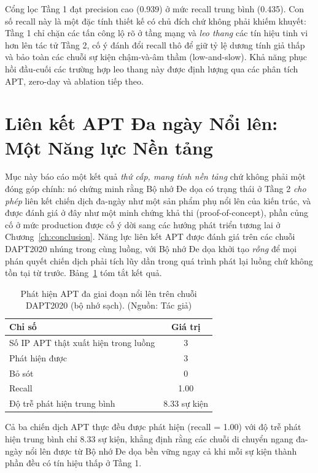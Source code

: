 Cổng lọc Tầng 1 đạt precision cao (0.939) ở mức recall trung bình (0.435). Con số recall này là một đặc tính thiết kế có chủ đích chứ không phải khiếm khuyết: Tầng 1 chỉ chặn các tấn công lộ rõ ở tầng mạng và \emph{leo thang} các tín hiệu tinh vi hơn lên tác tử Tầng 2, cố ý đánh đổi recall thô để giữ tỷ lệ dương tính giả thấp và bảo toàn các chuỗi sự kiện chậm-và-âm thầm (low-and-slow). Khả năng phục hồi đầu-cuối các trường hợp leo thang này được định lượng qua các phân tích APT, zero-day và ablation tiếp theo.

\section{Liên kết APT Đa ngày Nổi lên: Một Năng lực Nền tảng}
Mục này báo cáo một kết quả \emph{thứ cấp, mang tính nền tảng} chứ không phải một đóng góp chính: nó chứng minh rằng Bộ nhớ Đe dọa có trạng thái ở Tầng 2 \emph{cho phép} liên kết chiến dịch đa-ngày như một sản phẩm phụ nổi lên của kiến trúc, và được đánh giá ở đây như một minh chứng khả thi (proof-of-concept), phần củng cố ở mức production được cố ý dời sang các hướng phát triển tương lai ở Chương~\ref{ch:conclusion}. Năng lực liên kết APT được đánh giá trên các chuỗi DAPT2020 nhúng trong cùng luồng, với Bộ nhớ Đe dọa khởi tạo \emph{rỗng} để mọi phán quyết chiến dịch phải tích lũy dần trong quá trình phát lại luồng chứ không tồn tại từ trước. Bảng~\ref{tab:apt} tóm tắt kết quả.

\begin{table}[!htbp]
    \centering
    \caption{Phát hiện APT đa giai đoạn nổi lên trên chuỗi DAPT2020 (bộ nhớ sạch). (Nguồn: Tác giả)}
    \label{tab:apt}
    \begin{tabular}{|l|c|}
        \hline
        \textbf{Chỉ số} & \textbf{Giá trị} \\
        \hline
        Số IP APT thật xuất hiện trong luồng & 3 \\
        \hline
        Phát hiện được & 3 \\
        \hline
        Bỏ sót & 0 \\
        \hline
        Recall & 1.00 \\
        \hline
        Độ trễ phát hiện trung bình & 8.33 sự kiện \\
        \hline
    \end{tabular}
\end{table}

Cả ba chiến dịch APT thực đều được phát hiện (recall = 1.00) với độ trễ phát hiện trung bình chỉ 8.33 sự kiện, khẳng định rằng các chuỗi di chuyển ngang đa-ngày nổi lên được từ Bộ nhớ Đe dọa bền vững ngay cả khi mỗi sự kiện thành phần đều có tín hiệu thấp ở Tầng 1.

